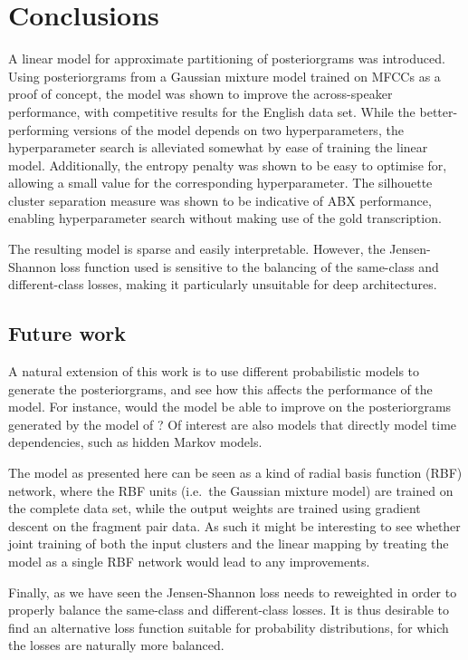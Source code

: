 \section{Conclusions}
A linear model for approximate partitioning of posteriorgrams was introduced.
Using posteriorgrams from a Gaussian mixture model trained on MFCCs as a proof of concept, the model was shown to improve the across-speaker performance, with competitive results for the English data set.
While the better-performing versions of the model depends on two hyperparameters, the hyperparameter search is alleviated somewhat by ease of training the linear model.
Additionally, the entropy penalty was shown to be easy to optimise for, allowing a small value for the corresponding hyperparameter.
The silhouette cluster separation measure was shown to be indicative of ABX performance, enabling hyperparameter search without making use of the gold transcription.

The resulting model is sparse and easily interpretable.
However, the Jensen-Shannon loss function used is sensitive to the balancing of the same-class and different-class losses, making it particularly unsuitable for deep architectures.

\subsection{Future work}
A natural extension of this work is to use different probabilistic models to generate the posteriorgrams, and see how this affects the performance of the model.
For instance, would the model be able to improve on the posteriorgrams generated by the model of \textcite{chen2015parallel}?
Of interest are also models that directly model time dependencies, such as hidden Markov models.

The model as presented here can be seen as a kind of radial basis function (RBF) network, where the RBF units (i.e.\ the Gaussian mixture model) are trained on the complete data set, while the output weights are trained using gradient descent on the fragment pair data.
As such it might be interesting to see whether joint training of both the input clusters and the linear mapping by treating the model as a single RBF network would lead to any improvements.

Finally, as we have seen the Jensen-Shannon loss needs to reweighted in order to properly balance the same-class and different-class losses.
It is thus desirable to find an alternative loss function suitable for probability distributions, for which the losses are naturally more balanced.



